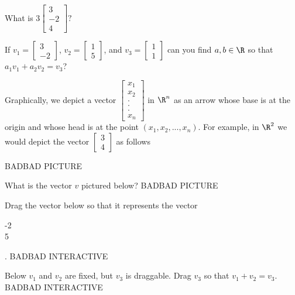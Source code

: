  	\begin{question}
 		What is $3\begin{bmatrix}
 		3\\-2\\4
 	 \end{bmatrix}?$
 	 
 	 \begin{question}
 	 	If $v_1 = \begin{bmatrix}
 		3\\-2
 	 \end{bmatrix} $,
 	  $v_2 = \begin{bmatrix}
 		1\\5
 	 \end{bmatrix}$,  and 
 	 $v_3 = \begin{bmatrix}
 		1\\1
 	 \end{bmatrix}$
 	 can you find $a,b \in \R$ so that $a_1v_1+a_2v_2=v_3$?
 	 \end{question}
 	
	Graphically, we depict a vector $\begin{bmatrix}
 		x_1\\
 		x_2\\
 		.\\
 		.\\
 		.\\
 		x_n
 	 \end{bmatrix}$ in $\R^n$ as an arrow whose base is at the origin and whose head is at  the point $(x_1,x_2,...,x_n)$.  For example, in $\R^2$ 
 	 we would depict the vector $\begin{bmatrix}3\\4\end{bmatrix}$ as follows
 	 
 	 BADBAD PICTURE
 	 
 	 \begin{question}
 	 	What is the vector $v$ pictured below?
 	 	BADBAD PICTURE
  	 \end{question}
  	 
  	 \begin{question}
  	 	Drag the vector below so that it represents the vector \begin{bmatrix}-2\\5\end{bmatrix}.
  	 	BADBAD INTERACTIVE
  	 \end{question}
  	 
  	 \begin{question}
  	 	Below $v_1$ and $v_2$ are fixed, but $v_3$ is draggable.  Drag $v_3$ so that $v_1+v_2 = v_3$.
  	 	BADBAD INTERACTIVE  
  	 \end{question}
  	 

\end{question}
